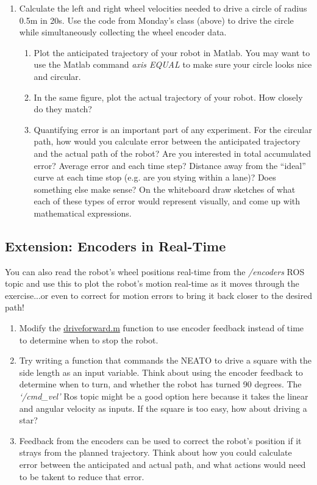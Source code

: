 \documentclass{tufte-handout}
\begin{document}
\begin{enumerate}[resume=exercises, label=\textbf{Exercise} (\arabic*)]
\item Calculate the left and right wheel velocities needed to drive a circle of radius 0.5m in 20s. Use the code from Monday's class (above) to drive the circle while simultaneously collecting the wheel encoder data. 
\begin{enumerate}
\item Plot the anticipated trajectory of your robot in Matlab. You may want to use the Matlab command \emph{axis EQUAL} to make sure your circle looks nice and circular.
\item In the same figure, plot the actual trajectory of your robot. How closely do they match?
\item Quantifying error is an important part of any experiment. For the circular path, how would you calculate error between the anticipated trajectory and the actual path of the robot? Are you interested in total accumulated error? Average error and each time step? Distance away from the ``ideal'' curve at each time stop (e.g. are you stying within a lane)? Does something else make sense? On the whiteboard draw sketches of what each of these types of error would represent visually, and come up with mathematical expressions.
\end{enumerate}

\end{enumerate}




\subsection{Extension: Encoders in Real-Time}
You can also read the robot's wheel positions real-time from the \emph{/encoders} ROS topic and use this to plot the robot's motion real-time as it moves through the exercise...or even to correct for motion errors to bring it back closer to the desired path!

\begin{enumerate}[resume=exercises, label=\textbf{Exercise} (\arabic*)]
\item Modify the \href{https://drive.google.com/file/d/1sq7yFwfhzcaJakDrcUYzD9HJHjxzhBs8/view?usp=sharing}{driveforward.m} function to use encoder feedback instead of time to determine when to stop the robot.

\item Try writing a function that commands the NEATO to drive a square with the side length as an input variable. Think about using the encoder feedback to determine when to turn, and whether the robot has turned 90 degrees. The \emph{`/cmd\_vel'} Ros topic might be a good option here because it takes the linear and angular velocity as inputs. If the square is too easy, how about driving a star? 

\item Feedback from the encoders can be used to correct the robot's position if it strays from the planned trajectory. Think about how you could calculate error between the anticipated and actual path, and what actions would need to be takent to reduce that error.

\end{enumerate}
\end{document}
